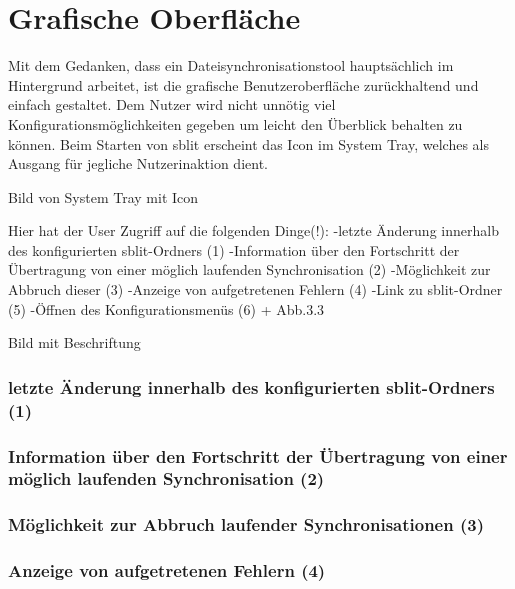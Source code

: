 \section{Grafische Oberfläche}

%
%

Mit dem Gedanken, dass ein Dateisynchronisationstool hauptsächlich im Hintergrund arbeitet, ist die grafische Benutzeroberfläche zurückhaltend und einfach gestaltet. Dem Nutzer wird nicht unnötig viel Konfigurationsmöglichkeiten gegeben um leicht den Überblick behalten zu können. 
Beim Starten von sblit erscheint das Icon im System Tray, welches als Ausgang für jegliche Nutzerinaktion dient.

{Bild von System Tray mit Icon}

%
%

Hier hat der User Zugriff auf die folgenden Dinge(!):
-letzte Änderung innerhalb des konfigurierten sblit-Ordners (1)
-Information über den Fortschritt der Übertragung von einer möglich laufenden Synchronisation (2)
-Möglichkeit zur Abbruch dieser (3)
-Anzeige von aufgetretenen Fehlern (4)
-Link zu sblit-Ordner (5)
-Öffnen des Konfigurationsmenüs  (6) + Abb.3.3

{Bild mit Beschriftung}

%
%
\subsubsection{letzte Änderung innerhalb des konfigurierten sblit-Ordners (1)}

\subsubsection{Information über den Fortschritt der Übertragung von einer möglich laufenden Synchronisation (2)}

\subsubsection{Möglichkeit zur Abbruch laufender Synchronisationen (3)}

\subsubsection{Anzeige von aufgetretenen Fehlern (4)}

